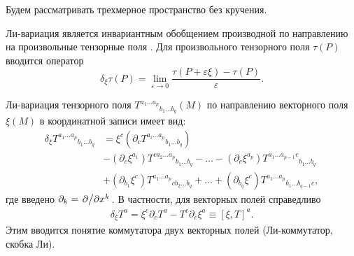 \documentclass[12pt,a4paper]{article}
\begin{document}
            Будем рассматривать трехмерное пространство без кручения\footnotemark{}.


            Ли-вариация является инвариантным обобщением производной по направлению на произвольные тензорные поля \cite{lie_derivative_theory,symmetry_and_killing_fields}. Для произвольного тензорного поля $\tau(P)$ вводится оператор
            \begin{equation}
                \delta_\xi \tau(P) = \lim\limits_{\varepsilon \to 0} \frac{
                    \tau(P + \varepsilon \xi) - \tau(P)
                }{\varepsilon}.
            \end{equation}

            Ли-вариация тензорного поля ${T^{a_1 \dots a_p}}_{b_1 \dots b_q}(M)$ по направлению векторного поля $\xi(M)$ в координатной записи имеет вид:
            \begin{equation}\begin{aligned}
                \delta_\xi {T^{a_1 \dots a_p}}_{b_1 \dots b_q}
                    &= \xi^c \left( \partial_c {T^{a_i \dots a_p}}_{b_1 \dots b_q} \right) \\
                    &- \left( \partial_{c} \xi^{a_1} \right) {T^{c a_2 \dots a_p}}_{b_1 \dots b_q} - \dots
                    - \left( \partial_{c} \xi^{a_p} \right) {T^{a_1 \dots a_{p-1} c}}_{b_1 \dots b_q} \\
                    &+ \left( \partial_{b_1} \xi^c \right) {T^{a_1 \dots a_p}}_{c b_2 \dots b_q} + \dots
                    + \left( \partial_{b_q} \xi^c \right) {T^{a_1 \dots a_p}}_{b_1 \dots b_{q-1} c} ,
            \end{aligned}\end{equation}
            где введено $\partial_k = \pdv*{x^k}$. В частности, для векторных полей справедливо
            \begin{equation}\begin{aligned}\label{eq:vector_field_commutator}
                \delta_\xi T^a
                    = \xi^c \partial_c T^a - T^c \partial_{c} \xi^a
                    \equiv [\xi, T]^a.
            \end{aligned}\end{equation}
            Этим вводится понятие коммутатора двух векторных полей (Ли-коммутатор, скобка Ли).
\end{document}
